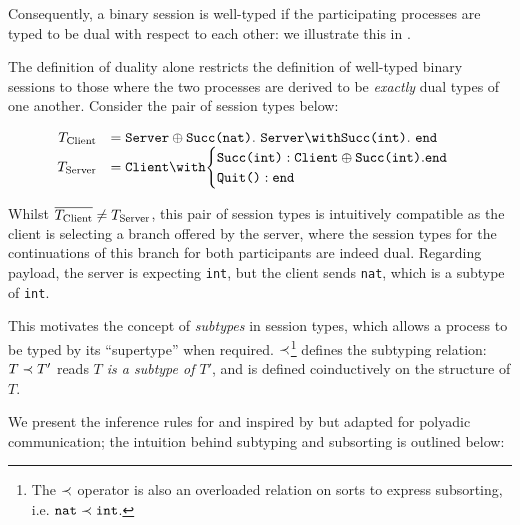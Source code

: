 Consequently, a binary session is well-typed 
if the participating processes are typed to be 
dual with respect to each other: 
we illustrate this in .

\begin{prooftree}
\end{prooftree}

The definition of duality alone 
restricts the definition of 
well-typed binary sessions to those
where the two processes are derived to be 
\textit{exactly} dual types of one another. 
Consider the pair of session types below:

\[
\begin{array}{rl}
T_{\text{Client}} &= 
	\tselone{Server}{\tmsg{Succ(nat)}}.~
	\tbraone{Server}{\tmsg{Succ(int)}}.~
	\tend \\
T_{\text{Server}} &= \tbraone{Client}{
\begin{cases}
	\tmsg{Succ(int)}: \tselone{Client}{\tmsg{Succ(int)}}. \tend \\
	\tmsg{Quit()}:  \tend \\
\end{cases}
} \\
\end{array}
\]

Whilst $\dual{T_{\text{Client}}} \neq T_{\text{Server}}$, 
this pair of session types is intuitively compatible 
as the client is selecting a branch offered by the server, 
where the session types for the continuations of 
this branch for both participants are indeed dual.
Regarding payload, the server is expecting \texttt{int},
but the client sends \texttt{nat}, which is a subtype of \texttt{int}.

This motivates the concept of \textit{subtypes} in session types,
which allows a process to be typed by its ``supertype'' when required. 
$\subtype$\footnote{
The $\subtype$ operator is also an 
overloaded relation on 
sorts to express subsorting, 
i.e. $\texttt{nat} \subtype \texttt{int}$.
} defines the subtyping relation: 
$T \subtype T'$ reads \textit{$T$ is a subtype of $T'$},
and is defined coinductively on the structure of $T$.

We present the inference rules for 
 and 
inspired by \cite{MPST} but adapted for polyadic communication; 
the intuition behind subtyping and subsorting is outlined below:

